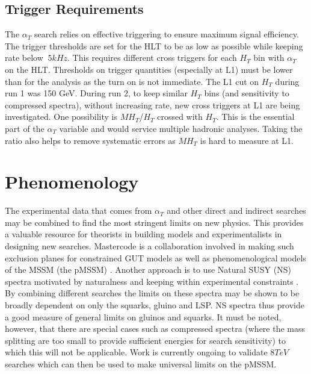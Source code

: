 \subsection{Trigger Requirements}
The $\alpha_T$ search relies on effective triggering to ensure maximum signal efficiency. The trigger thresholds are set for the HLT to be as low as possible while keeping rate below $~5kHz$. This requires different cross triggers for each $H_T$ bin with $\alpha_T$ on the HLT. Thresholds on trigger quantities (especially at L1) must be lower than for the analysis as the turn on is not immediate. The L1 cut on $H_T$ during run 1 was 150 GeV. During run 2, to keep similar $H_T$ bins (and sensitivity to compressed spectra), without increasing rate, new cross triggers at L1 are being investigated. One possibility is $MH_T$/$H_T$ crossed with $H_T$. This is the essential part of the $\alpha_T$ variable and would service multiple hadronic analyses. Taking the ratio also helps to remove systematic errors as $MH_T$ is hard to measure at L1. 
\section{Phenomenology}
The experimental data that comes from $\alpha_T$ and other direct and indirect searches may be combined to find the most stringent limits on new physics. This provides a valuable resource for theorists in building models and experimentalists in designing new searches. Mastercode is a collaboration involved in making such exclusion planes for constrained GUT models as well as phenomenological models of the MSSM (the pMSSM) \cite{mcode} . Another approach is to use Natural SUSY (NS) spectra motivated by naturalness and keeping within experimental constraints \cite{joliver}. By combining different searches the limits on these spectra may be shown to be broadly dependent on only the squarks, gluino and LSP. NS spectra thus provide a good measure of general limits on gluinos and squarks. It must be noted, however, that there are special cases such as compressed spectra (where the mass splitting are too small to provide sufficient energies for search sensitivity) to which this will not be applicable. Work is currently ongoing to validate $8 TeV$ searches which can then be used to make universal limits on the pMSSM.


